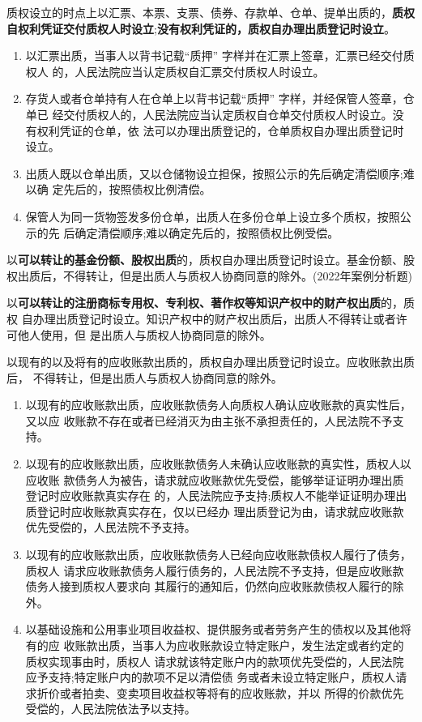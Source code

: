 \documentclass[UTF8,12pt]{ctexart}
\numberwithin{equation}{section} %
\numberwithin{figure}{section}
\numberwithin{table}{section}
\begin{document}
	质权设立的时点上以汇票、本票、支票、债券、存款单、仓单、提单出质的，\textbf{质权自权利凭证交付质权人时设立};\textbf{没有权利凭证的，质权自办理出质登记时设立}。
	\begin{enumerate}
		\item 以汇票出质，当事人以背书记载“质押” 字样并在汇票上签章，汇票已经交付质权人 的，人民法院应当认定质权自汇票交付质权人时设立。 
		
		\item 存货人或者仓单持有人在仓单上以背书记载“质押” 字样，并经保管人签章，仓单已 经交付质权人的，人民法院应当认定质权自仓单交付质权人时设立。没有权利凭证的仓单，依 法可以办理出质登记的，仓单质权自办理出质登记时设立。
		
		\item 出质人既以仓单出质，又以仓储物设立担保，按照公示的先后确定清偿顺序;难以确 定先后的，按照债权比例清偿。 
		
		\item 保管人为同一货物签发多份仓单，出质人在多份仓单上设立多个质权，按照公示的先 后确定清偿顺序;难以确定先后的，按照债权比例受偿。
	\end{enumerate} 
	
	以\textbf{可以转让的基金份额、股权出质}的，质权自办理出质登记时设立。基金份额、股权出质后，不得转让，但是出质人与质权人协商同意的除外。(2022年案例分析题)
	
	以\textbf{可以转让的注册商标专用权、专利权、著作权等知识产权中的财产权出质}的，质权 自办理出质登记时设立。知识产权中的财产权出质后，出质人不得转让或者许可他人使用，但 是出质人与质权人协商同意的除外。
	
	以现有的以及将有的应收账款出质的，质权自办理出质登记时设立。应收账款出质后， 不得转让，但是出质人与质权人协商同意的除外。
	\begin{enumerate}
		\item  以现有的应收账款出质，应收账款债务人向质权人确认应收账款的真实性后，又以应 收账款不存在或者已经消灭为由主张不承担责任的，人民法院不予支持。
		
		\item 以现有的应收账款出质，应收账款债务人未确认应收账款的真实性，质权人以应收账 款债务人为被告，请求就应收账款优先受偿，能够举证证明办理出质登记时应收账款真实存在 的，人民法院应予支持;质权人不能举证证明办理出质登记时应收账款真实存在，仅以已经办 理出质登记为由，请求就应收账款优先受偿的，人民法院不予支持。 
		
		\item 以现有的应收账款出质，应收账款债务人已经向应收账款债权人履行了债务，质权人 请求应收账款债务人履行债务的，人民法院不予支持，但是应收账款债务人接到质权人要求向 其履行的通知后，仍然向应收账款债权人履行的除外。
		
		\item 以基础设施和公用事业项目收益权、提供服务或者劳务产生的债权以及其他将有的应 收账款出质，当事人为应收账款设立特定账户，发生法定或者约定的质权实现事由时，质权人 请求就该特定账户内的款项优先受偿的，人民法院应予支持;特定账户内的款项不足以清偿债 务或者未设立特定账户，质权人请求折价或者拍卖、变卖项目收益权等将有的应收账款，并以 所得的价款优先受偿的，人民法院依法予以支持。
	\end{enumerate}
\end{document}
